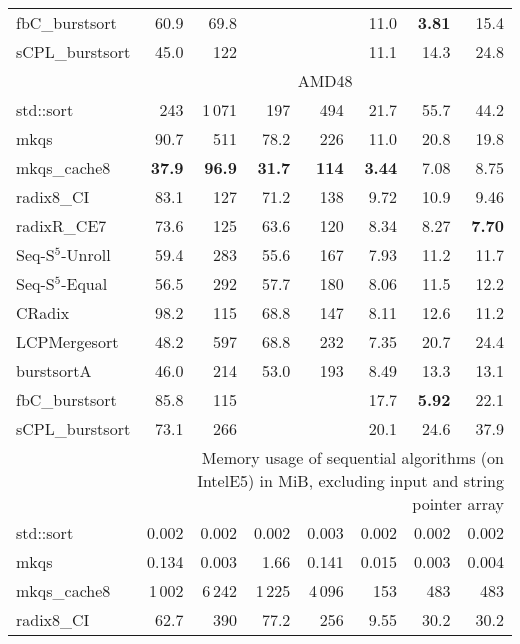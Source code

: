 \documentclass[a4paper]{myjournal}
\begin{document}
\begin{table}[p]
\begin{tabular}{l|rrrr*{3}{r}|}
  fbC\_burstsort &     60.9 &     69.8 &          &          &     11.0 & \bf 3.81 &     15.4 \\
 sCPL\_burstsort &     45.0 &      122 &          &          &     11.1 &     14.3 &     24.8 \\ \hline
& \multicolumn{7}{c|}{AMD48} \\ \cline{2-8}
std::sort &      243 &   1\,071 &      197 &     494 &     21.7 &     55.7 &     44.2 \\
            mkqs &     90.7 &      511 &     78.2 &     226 &     11.0 &     20.8 &     19.8 \\
    mkqs\_cache8 & \bf 37.9 & \bf 96.9 & \bf 31.7 & \bf 114 & \bf 3.44 &     7.08 &     8.75 \\
      radix8\_CI &     83.1 &      127 &     71.2 &     138 &     9.72 &     10.9 &     9.46 \\
     radixR\_CE7 &     73.6 &      125 &     63.6 &     120 &     8.34 &     8.27 & \bf 7.70 \\
Seq-S$^5$-Unroll &     59.4 &      283 &     55.6 &     167 &     7.93 &     11.2 &     11.7 \\
 Seq-S$^5$-Equal &     56.5 &      292 &     57.7 &     180 &     8.06 &     11.5 &     12.2 \\
          CRadix &     98.2 &      115 &     68.8 &     147 &     8.11 &     12.6 &     11.2 \\
    LCPMergesort &     48.2 &      597 &     68.8 &     232 &     7.35 &     20.7 &     24.4 \\
      burstsortA &     46.0 &      214 &     53.0 &     193 &     8.49 &     13.3 &     13.1 \\
  fbC\_burstsort &     85.8 &      115 &          &         &     17.7 & \bf 5.92 &     22.1 \\
 sCPL\_burstsort &     73.1 &      266 &          &         &     20.1 &     24.6 &     37.9 \\ \hline
& \multicolumn{7}{p{76ex}|}{\centering{}Memory usage of sequential algorithms (on IntelE5) in MiB, excluding input and string pointer array} \\ \cline{2-8}
std::sort &   0.002 &  0.002 &  0.002 &  0.003 &  0.002 &  0.002 &  0.002 \\
            mkqs &   0.134 &  0.003 &   1.66 &  0.141 &  0.015 &  0.003 &  0.004 \\
    mkqs\_cache8 &  1\,002 & 6\,242 & 1\,225 & 4\,096 &    153 &    483 &    483 \\
      radix8\_CI &    62.7 &    390 &   77.2 &    256 &   9.55 &   30.2 &   30.2 \\

\end{tabular}
\end{table}
\end{document}
